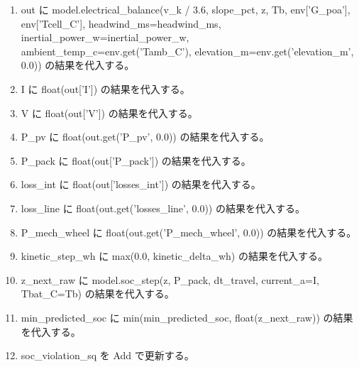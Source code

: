 \documentclass[a4paper,11pt]{article}
\begin{document}
\begin{enumerate}[leftmargin=1.8em]
\item     out に model.electrical\_balance(v\_k / 3.6, slope\_pct, z, Tb, env['G\_poa'], env['Tcell\_C'], headwind\_ms=headwind\_ms, inertial\_power\_w=inertial\_power\_w, ambient\_temp\_c=env.get('Tamb\_C'), elevation\_m=env.get('elevation\_m', 0.0)) の結果を代入する。
\item     I に float(out['I']) の結果を代入する。
\item     V に float(out['V']) の結果を代入する。
\item     P\_pv に float(out.get('P\_pv', 0.0)) の結果を代入する。
\item     P\_pack に float(out['P\_pack']) の結果を代入する。
\item     loss\_int に float(out['losses\_int']) の結果を代入する。
\item     loss\_line に float(out.get('losses\_line', 0.0)) の結果を代入する。
\item     P\_mech\_wheel に float(out.get('P\_mech\_wheel', 0.0)) の結果を代入する。
\item     kinetic\_step\_wh に max(0.0, kinetic\_delta\_wh) の結果を代入する。
\item     z\_next\_raw に model.soc\_step(z, P\_pack, dt\_travel, current\_a=I, Tbat\_C=Tb) の結果を代入する。
\item     min\_predicted\_soc に min(min\_predicted\_soc, float(z\_next\_raw)) の結果を代入する。
\item     soc\_violation\_sq を Add で更新する。
            \end{enumerate}
\end{document}
